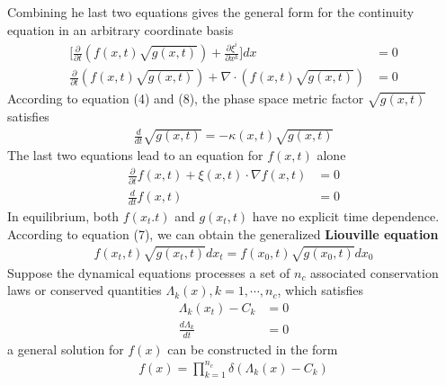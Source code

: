 \documentclass{article}
\begin{document}
Combining he last two equations gives the general form for the continuity equation in an arbitrary coordinate basis
\begin{align}
\bigg[\frac{\partial}{\partial t}(f(x,t)\sqrt{g(x,t)})+\frac{\partial\xi^i}{\partial x^k}\bigg]dx&=0\\
\frac{\partial}{\partial t}(f(x,t)\sqrt{g(x,t)})+\nabla\cdot(f(x,t)\sqrt{g(x,t)})&=0
\end{align}
According to equation (4) and (8), the phase space metric factor $\sqrt{g(x,t)}$ satisfies
\begin{align}
\frac{d}{dt}\sqrt{g(x,t)}=-\kappa(x,t)\sqrt{g(x,t)}
\end{align}
The last two equations lead to an equation for $f(x,t)$ alone
\begin{align}
\frac{\partial}{\partial t}f(x,t)+\xi(x,t)\cdot\nabla f(x,t)&=0\\
\frac{d}{dt}f(x,t)&=0
\end{align}
In equilibrium, both $f(x_t.t)$ and $g(x_t,t)$ have no explicit time dependence.\\
According to equation (7), we can obtain the generalized \textbf{Liouville equation}
\begin{align}
f(x_t,t)\sqrt{g(x_t,t)}dx_t=f(x_0,t)\sqrt{g(x_0,t)}dx_0
\end{align}
Suppose the dynamical equations processes a set of $n_c$ associated conservation laws or conserved quantities $\Lambda_k(x),k=1,\cdots,n_c$, which satisfies
\begin{align*}
\Lambda_k(x_t)-C_k&=0\\
\frac{d\Lambda_k}{dt}&=0
\end{align*}
a general solution for $f(x)$ can be constructed in the form
\begin{align}
f(x)=\prod^{n_c}_{k=1}\delta(\Lambda_k(x)-C_k)
\end{align}
\end{document}
